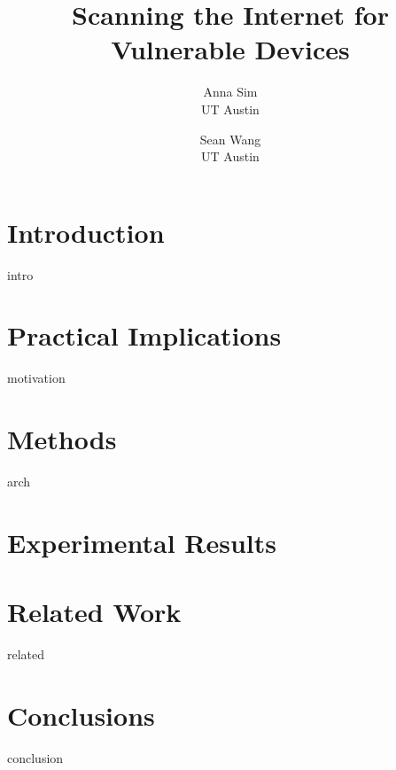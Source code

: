 \documentclass{sig-alternate}
\newcommand{\ignore}[1]{}
\begin{document}
\title{Scanning the Internet for Vulnerable Devices}
\author{Anna Sim \\ UT Austin \and Sean Wang \\ UT Austin}


\date{}  %

\maketitle

\begin{abstract}
 
\end{abstract}

\section{Introduction}
\label{sec:intro}
 {intro}

\section{Practical Implications}
\label{sec:motivation}
 {motivation}

\ignore{Sometimes background is merged into motivation, and is not required separately.}

\section{Methods}
\label{sec:arch}
 {arch}

\section{Experimental Results}
\label{sec:results}


\section{Related Work}
\label{sec:related}
 {related}

\section{Conclusions}
\label{sec:conclusion}
 {conclusion}


{ 


}
\end{document}
